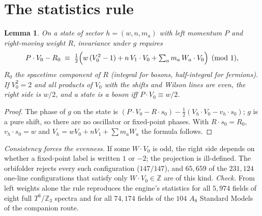 \documentclass[11pt]{article}
\newtheorem{lemma}{Lemma}
\begin{document}
\section{The statistics rule}
\begin{lemma}\label{lem:rule}
On a state of sector $h=(w,n,m_a)$ with left momentum $P$ and right-moving weight $R$, invariance under $g$ requires
\[
P\cdot V_0-R_0\;\equiv\;\tfrac12\Bigl(w\,(V_0^2-1)+n\,V_1\cdot V_0+\textstyle\sum_a m_a\,W_a\cdot V_0\Bigr)\pmod 1 ,
\]
$R_0$ the spacetime component of $R$ (integral for bosons, half-integral for fermions). If $V_0^2=2$ and all products of $V_0$ with
the shifts and Wilson lines are even, the right side is $w/2$, and a state is a boson iff $P\cdot V_0\equiv w/2$.
\end{lemma}
\begin{proof}
The phase of $g$ on the state is $(P\cdot V_0-R\cdot s_0)-\tfrac12(V_h\cdot V_0-v_h\cdot s_0)$; $g$ is a pure shift, so there are no
oscillator or fixed-point phases. With $R\cdot s_0=R_0$, $v_h\cdot s_0=w$ and $V_h=wV_0+nV_1+\sum m_aW_a$ the formula follows.
\end{proof}
\emph{Consistency forces the evenness.} If some $W\cdot V_0$ is odd, the right side depends on whether a fixed-point label is written
$1$ or $-2$; the projection is ill-defined. The orbifolder rejects every such configuration ($147/147$), and $65{,}659$ of the $231{,}124$
one-line configurations that satisfy only $W\cdot V_0\in\mathbb Z$ are of this kind.
\emph{Check.} From left weights alone the rule reproduces the engine's statistics for all $5{,}974$ fields of eight full $T^6/\mathbb Z_3$
spectra and for all $74{,}174$ fields of the $104$ $A_8$ Standard Models of the companion route.
\end{document}
